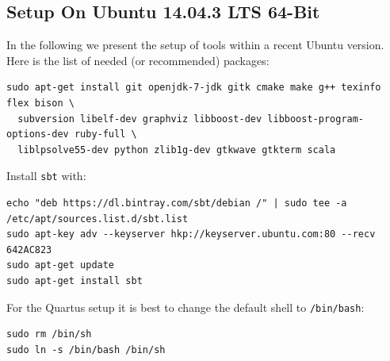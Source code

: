 \documentclass[a4paper,fontsize=10pt,twoside,DIV15,BCOR12mm,headinclude=true,footinclude=false,pagesize,bibtotoc]{scrbook}
\newcommand{\code}[1]{{\texttt{#1}}}
\begin{document}
\subsection{Setup On Ubuntu 14.04.3 LTS 64-Bit}

In the following we present the setup of tools within a recent Ubuntu version.
Here is the list of needed (or recommended) packages:

\begin{verbatim}
sudo apt-get install git openjdk-7-jdk gitk cmake make g++ texinfo flex bison \
  subversion libelf-dev graphviz libboost-dev libboost-program-options-dev ruby-full \
  liblpsolve55-dev python zlib1g-dev gtkwave gtkterm scala
\end{verbatim}

Install \code{sbt} with:

\begin{verbatim}
echo "deb https://dl.bintray.com/sbt/debian /" | sudo tee -a /etc/apt/sources.list.d/sbt.list
sudo apt-key adv --keyserver hkp://keyserver.ubuntu.com:80 --recv 642AC823
sudo apt-get update
sudo apt-get install sbt
\end{verbatim}


For the Quartus setup it is best to change the default shell to \code{/bin/bash}:

\begin{verbatim}
sudo rm /bin/sh
sudo ln -s /bin/bash /bin/sh
\end{verbatim}
\end{document}
